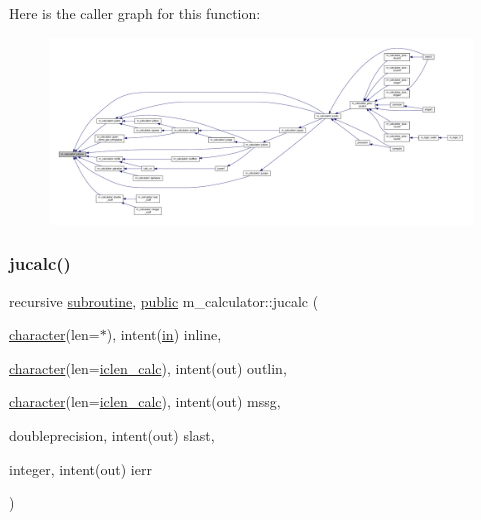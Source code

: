 Here is the caller graph for this function\+:
\nopagebreak
\begin{figure}[H]
\begin{center}
\leavevmode
\includegraphics[width=350pt]{namespacem__calculator_a82912c44b358ca053754669f542d80af_icgraph}
\end{center}
\end{figure}
\mbox{\label{namespacem__calculator_a2a06dd612d1c0e059f6fb2a267325201}} 
\subsubsection{\texorpdfstring{jucalc()}{jucalc()}}
{\footnotesize\ttfamily recursive \hyperlink{M__stopwatch_83_8txt_acfbcff50169d691ff02d4a123ed70482}{subroutine}, \hyperlink{M__stopwatch_83_8txt_a2f74811300c361e53b430611a7d1769f}{public} m\+\_\+calculator\+::jucalc (\begin{DoxyParamCaption}\item[{\hyperlink{option__stopwatch_83_8txt_abd4b21fbbd175834027b5224bfe97e66}{character}(len=$\ast$), intent(\hyperlink{M__journal_83_8txt_afce72651d1eed785a2132bee863b2f38}{in})}]{inline,  }\item[{\hyperlink{option__stopwatch_83_8txt_abd4b21fbbd175834027b5224bfe97e66}{character}(len=\hyperlink{namespacem__calculator_accf705491e8bd9b3d2f0d04fd13712e7}{iclen\+\_\+calc}), intent(out)}]{outlin,  }\item[{\hyperlink{option__stopwatch_83_8txt_abd4b21fbbd175834027b5224bfe97e66}{character}(len=\hyperlink{namespacem__calculator_accf705491e8bd9b3d2f0d04fd13712e7}{iclen\+\_\+calc}), intent(out)}]{mssg,  }\item[{doubleprecision, intent(out)}]{slast,  }\item[{integer, intent(out)}]{ierr }\end{DoxyParamCaption})}



